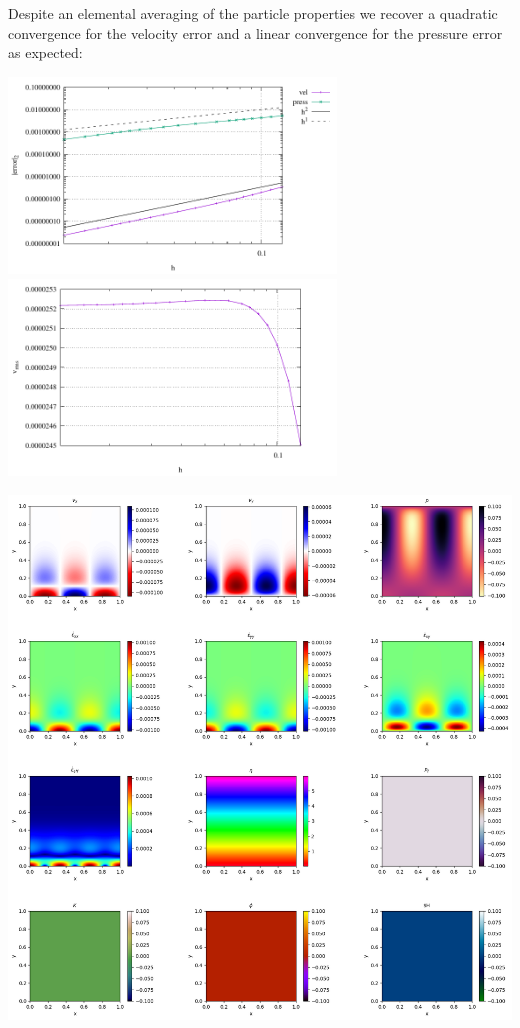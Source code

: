 \documentclass[a4paper]{article}
\begin{document}
Despite an elemental averaging of the particle properties
we recover a quadratic convergence for the velocity error and a linear
convergence for the pressure error as expected:
\begin{center}
\includegraphics[width=8.7cm]{./results/benchmark_solkz/convergence.pdf}
\includegraphics[width=8.7cm]{./results/benchmark_solkz/vrms.pdf}
\end{center}

\newpage
\begin{center}
\includegraphics[width=14cm]{./results/benchmark_solkz/img_solution_0000.png}
\end{center}
\end{document}
